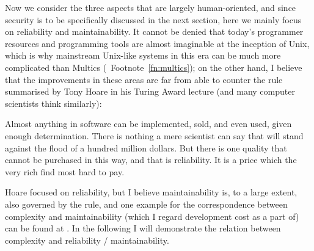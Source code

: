 Now we consider the three aspects that are largely human-oriented, and since
security is to be specifically discussed in the next section, here we mainly
focus on reliability and maintainability.  It cannot be denied that today's
programmer resources and programming tools are almost imaginable at the
inception of Unix, which is why mainstream Unix-like systems in this era can
be much more complicated than Multics (\cf~Footnote~\ref{fn:multics}); on the
other hand, I believe that the improvements in these areas are far from able
to counter the rule summarised by Tony Hoare in his Turing Award lecture%
 (and many computer scientists think similarly):
\begin{quoting}
	Almost anything in software can be implemented, sold, and even used, given
	enough determination.  There is nothing a mere scientist can say that will
	stand against the flood of a hundred million dollars.  But there is one
	quality that cannot be purchased in this way, and that is reliability.
	It is a price which the very rich find most hard to pay.
\end{quoting}
Hoare focused on reliability, but I believe maintainability is, to a large
extent, also governed by the rule, and one example for the correspondence
between complexity and maintainability (which I regard development cost as a
part of) can be found at \parencite{rbrander2017}.  In the following I will
demonstrate the relation between complexity and reliability / maintainability.

